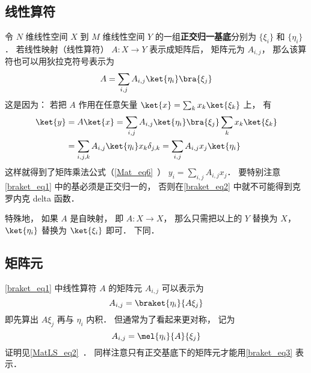 \subsection{线性算符}
令 $N$ 维线性空间 $X$ 到 $M$ 维线性空间 $Y$ 的一组\textbf{正交归一基底}分别为 $\{\xi_i\}$ 和 $\{\eta_i\}$． 若线性映射（线性算符） $A:X\to Y$ 表示成矩阵后， 矩阵元为 $A_{i,j}$， 那么该算符也可以用狄拉克符号表示为
\begin{equation}\label{braket_eq1}
A = \sum_{i,j} A_{i,j} \ket{\eta_i}\bra{\xi_j}
\end{equation}
这是因为： 若把 $A$ 作用在任意矢量 $\ket{x} = \sum_k x_k\ket{\xi_k}$ 上， 有
\begin{equation}\label{braket_eq2}
\begin{aligned}
\ket{y} &= A\ket{x} = \sum_{i,j} A_{i,j} \ket{\eta_i}\bra{\xi_j} \sum_k x_k\ket{\xi_k}\\
&= \sum_{i,j, k} A_{i,j} \ket{\eta_i} x_k \delta_{j,k}
= \sum_{i,j} A_{i,j} x_j \ket{\eta_i}
\end{aligned}
\end{equation}
这样就得到了矩阵乘法公式（\autoref{Mat_eq6}~） $y_i = \sum_{i,j} A_{i,j} x_j$． 要特别注意\autoref{braket_eq1} 中的基必须是正交归一的， 否则在\autoref{braket_eq2} 中就不可能得到克罗内克 delta 函数．

特殊地， 如果 $A$ 是自映射， 即 $A:X\to X$， 那么只需把以上的 $Y$ 替换为 $X$， $\ket{\eta_i}$ 替换为 $\ket{\xi_i}$ 即可． 下同．

\subsection{矩阵元}
\autoref{braket_eq1} 中线性算符 $A$ 的矩阵元 $A_{i,j}$ 可以表示为
\begin{equation}
A_{i,j} = \braket{\eta_i}{A\xi_j}
\end{equation}
即先算出 $A\xi_j$ 再与 $\eta_i$ 内积． 但通常为了看起来更对称， 记为
\begin{equation}\label{braket_eq3}
A_{i,j} = \mel{\eta_i}{A}{\xi_j}
\end{equation}
证明见\autoref{MatLS_eq2}~． 同样注意只有正交基底下的矩阵元才能用\autoref{braket_eq3} 表示．
